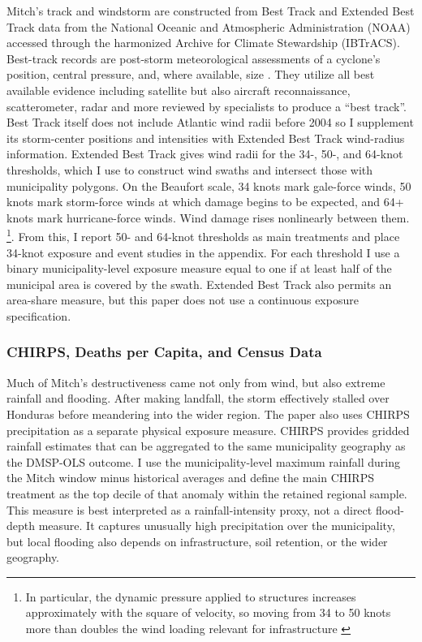\documentclass[12pt]{article}
\begin{document}
Mitch's track and windstorm are constructed from Best Track and Extended Best Track data from the National Oceanic and Atmospheric Administration (NOAA) accessed through the harmonized Archive for Climate Stewardship (IBTrACS). Best-track records are post-storm meteorological assessments of a cyclone's position, central pressure, and, where available, size \parencite{landsea2013atlantic}. They utilize all best available evidence including satellite but also aircraft reconnaissance, scatterometer, radar and more reviewed by specialists to produce a ``best track''. Best Track itself does not include Atlantic wind radii before 2004 so I supplement its storm-center positions and intensities with Extended Best Track wind-radius information. Extended Best Track gives wind radii for the 34-, 50-, and 64-knot thresholds, which I use to construct wind swaths and intersect those with municipality polygons. On the Beaufort scale, 34 knots mark gale-force winds, 50 knots mark storm-force winds at which damage begins to be expected, and 64+ knots mark hurricane-force winds. Wind damage rises nonlinearly between them. \footnote{In particular, the dynamic pressure applied to structures increases approximately with the square of velocity, so moving from 34 to 50 knots more than doubles the wind loading relevant for infrastructure \parencite{nhc2017product}}. From this, I report 50- and 64-knot thresholds as main treatments and place 34-knot exposure and event studies in the appendix. For each threshold I use a binary municipality-level exposure measure equal to one if at least half of the municipal area is covered by the swath. Extended Best Track also permits an area-share measure, but this paper does not use a continuous exposure specification.

\subsubsection{CHIRPS, Deaths per Capita, and Census Data}

Much of Mitch's destructiveness came not only from wind, but also extreme rainfall and flooding. After making landfall, the storm effectively stalled over Honduras before meandering into the wider region. The paper also uses CHIRPS precipitation as a separate physical exposure measure. CHIRPS provides gridded rainfall estimates that can be aggregated to the same municipality geography as the DMSP-OLS outcome. I use the municipality-level maximum rainfall during the Mitch window minus historical averages and define the main CHIRPS treatment as the top decile of that anomaly within the retained regional sample. This measure is best interpreted as a rainfall-intensity proxy, not a direct flood-depth measure. It captures unusually high precipitation over the municipality, but local flooding also depends on infrastructure, soil retention, or the wider geography. 
\end{document}
